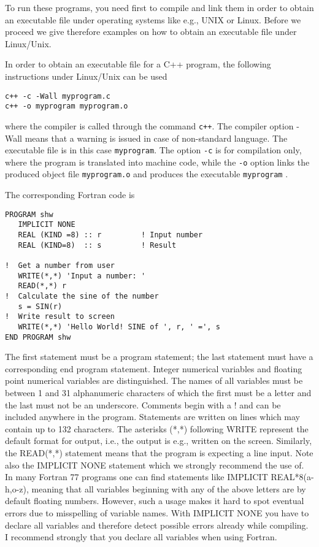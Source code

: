 To run these programs, you need first to compile and link
them in order to obtain an executable file under operating systems like  e.g., 
UNIX or Linux. 
Before we proceed we give therefore examples on how to obtain an
executable file under Linux/Unix. 

In order to obtain an executable file for a C++ program, the following 
instructions under Linux/Unix can be used
\begin{svgraybox}
\begin{verbatim}
c++ -c -Wall myprogram.c
c++ -o myprogram myprogram.o
\end{verbatim}
\end{svgraybox}
where the compiler is called through the command \verb$c++$. The compiler
option -Wall means that a warning is issued in case of non-standard
language. The executable file is in this case \verb$myprogram$. The option
\verb$-c$ is for compilation only, where the program is translated into machine code,
while the \verb$-o$ option links the produced object file \verb$myprogram.o$ 
and produces the executable \verb$myprogram$ .

The corresponding Fortran  code is 
\lstset{language=[90]Fortran}
\begin{lstlisting}[title={\url{http://folk.uio.no/mhjensen/compphys/programs/chapter02/Fortran/program1.f90}}]
PROGRAM shw
   IMPLICIT NONE
   REAL (KIND =8) :: r         ! Input number
   REAL (KIND=8)  :: s         ! Result

!  Get a number from user
   WRITE(*,*) 'Input a number: '
   READ(*,*) r
!  Calculate the sine of the number
   s = SIN(r)
!  Write result to screen
   WRITE(*,*) 'Hello World! SINE of ', r, ' =', s
END PROGRAM shw
\end{lstlisting}
 The first statement must be a program statement; the last statement must have a
corresponding end program statement. 
Integer numerical variables and floating point numerical variables are distinguished. The
names of all variables must be between 1 and 31 alphanumeric characters of which the first
must be a letter and the last must not be an underscore. 
Comments begin with a ! and can be included anywhere in the program. 
Statements are written on lines which may contain up to 132 characters. 
The asterisks (*,*) following WRITE represent 
the default format for output, i.e., the output is e.g., 
written on the screen. Similarly, the READ(*,*) statement means
that the program is expecting a line input.
Note also the IMPLICIT NONE statement which we 
strongly recommend the use of. In many Fortran 77 programs one can  find
statements like IMPLICIT REAL*8(a-h,o-z), meaning
that all variables beginning with any of the above 
letters are by default floating numbers. However,
such a usage makes it hard to spot eventual errors
due to misspelling of variable names. With IMPLICIT NONE
you have to declare all variables and therefore detect
possible errors already while compiling. I recommend strongly that you declare all variables
when using Fortran.

